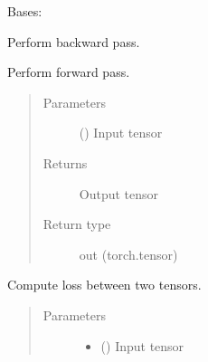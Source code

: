 \documentclass[letterpaper,10pt,english,openany,oneside]{sphinxmanual}
\begin{document}
\begin{fulllineitems}
\label{\detokenize{nn:nn.sequential.Sequential}}
Bases: {\hyperref[\detokenize{nn:nn.module.Module}]{}}

\begin{fulllineitems}
\label{\detokenize{nn:nn.sequential.Sequential.backward}}
Perform backward pass.

\end{fulllineitems}


\begin{fulllineitems}
\label{\detokenize{nn:nn.sequential.Sequential.forward}}
Perform forward pass.
\begin{quote}\begin{description}
\item[{Parameters}] \leavevmode
{} () \textendash{} Input tensor

\item[{Returns}] \leavevmode
Output tensor

\item[{Return type}] \leavevmode
out (torch.tensor)

\end{description}\end{quote}

\end{fulllineitems}


\begin{fulllineitems}
\label{\detokenize{nn:nn.sequential.Sequential.loss}}
Compute loss between two tensors.
\begin{quote}\begin{description}
\item[{Parameters}] \leavevmode\begin{itemize}
\item {} 
 () \textendash{} Input tensor


\end{itemize}
\end{description}
\end{quote}
\end{fulllineitems}
\end{fulllineitems}
\end{document}
